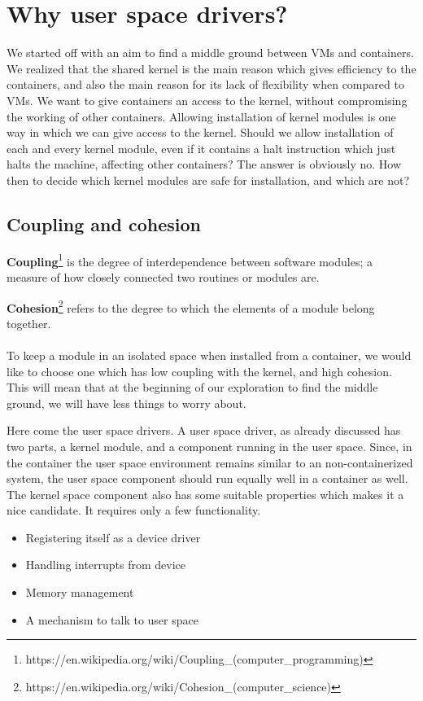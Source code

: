 \documentclass[twoside]{iitbreport}
\begin{document}
\section{Why user space drivers?}
We started off with an aim to find a middle ground between VMs and containers. We realized that the shared kernel is the main reason which gives efficiency to the containers, and also the main reason for its lack of flexibility when compared to VMs. We want to give containers an access to the kernel, without compromising the working of other containers. Allowing installation of kernel modules is one way in which we can give access to the kernel. Should we allow installation of each and every kernel module, even if it contains a halt instruction which just halts the machine, affecting other containers? The answer is obviously no. How then to decide which kernel modules are safe for installation, and which are not?

\subsection{Coupling and cohesion}
\textbf{Coupling}\footnote{https://en.wikipedia.org/wiki/Coupling\_(computer\_programming)} is the degree of interdependence between software modules; a measure of how closely connected two routines or modules are.

\textbf{Cohesion}\footnote{https://en.wikipedia.org/wiki/Cohesion\_(computer\_science)} refers to the degree to which the elements of a module belong together.
\\
\\
To keep a module in an isolated space when installed from a container, we would like to choose one which has low coupling with the kernel, and high cohesion. This will mean that at the beginning of our exploration to find the middle ground, we will have less things to worry about.


Here come the user space drivers. A user space driver, as already discussed has two parts, a kernel module, and a component running in the user space. Since, in the container the user space environment remains similar to an non-containerized system, the user space component should run equally well in a container as well. The kernel space component also has some suitable properties which makes it a nice candidate. It requires only a few functionality.

\begin{itemize}
\item Registering itself as a device driver
\item Handling interrupts from device
\item Memory management
\item A mechanism to talk to user space
\end{itemize}
\end{document}
